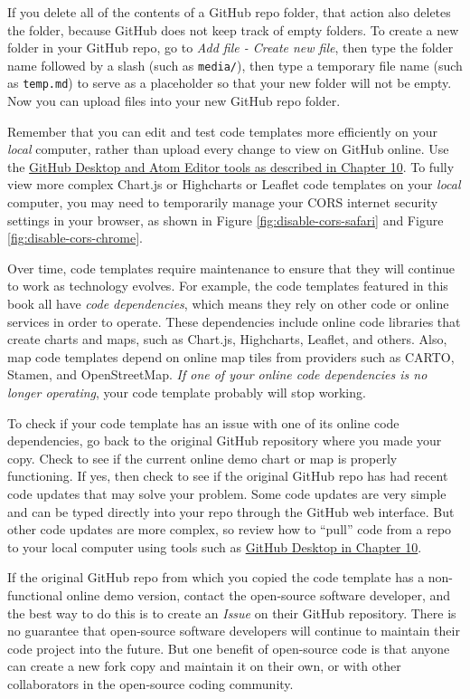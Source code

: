 \documentclass[
  english,
]{book}
\begin{document}
If you delete all of the contents of a GitHub repo folder, that action also deletes the folder, because GitHub does not keep track of empty folders. To create a new folder in your GitHub repo, go to \emph{Add file - Create new file}, then type the folder name followed by a slash (such as \texttt{media/}), then type a temporary file name (such as \texttt{temp.md}) to serve as a placeholder so that your new folder will not be empty. Now you can upload files into your new GitHub repo folder.

Remember that you can edit and test code templates more efficiently on your \emph{local} computer, rather than upload every change to view on GitHub online. Use the \href{github-desktop-atom.html}{GitHub Desktop and Atom Editor tools as described in Chapter 10}. To fully view more complex Chart.js or Highcharts or Leaflet code templates on your \emph{local} computer, you may need to temporarily manage your CORS internet security settings in your browser, as shown in Figure \ref{fig:disable-cors-safari} and Figure \ref{fig:disable-cors-chrome}.

Over time, code templates require maintenance to ensure that they will continue to work as technology evolves. For example, the code templates featured in this book all have \emph{code dependencies}, which means they rely on other code or online services in order to operate. These dependencies include online code libraries that create charts and maps, such as Chart.js, Highcharts, Leaflet, and others. Also, map code templates depend on online map tiles from providers such as CARTO, Stamen, and OpenStreetMap. \emph{If one of your online code dependencies is no longer operating}, your code template probably will stop working.

To check if your code template has an issue with one of its online code dependencies, go back to the original GitHub repository where you made your copy. Check to see if the current online demo chart or map is properly functioning. If yes, then check to see if the original GitHub repo has had recent code updates that may solve your problem. Some code updates are very simple and can be typed directly into your repo through the GitHub web interface. But other code updates are more complex, so review how to ``pull'' code from a repo to your local computer using tools such as \href{github-desktop-atom.html}{GitHub Desktop in Chapter 10}.

If the original GitHub repo from which you copied the code template has a non-functional online demo version, contact the open-source software developer, and the best way to do this is to create an \emph{Issue} on their GitHub repository. There is no guarantee that open-source software developers will continue to maintain their code project into the future. But one benefit of open-source code is that anyone can create a new fork copy and maintain it on their own, or with other collaborators in the open-source coding community.
\end{document}
